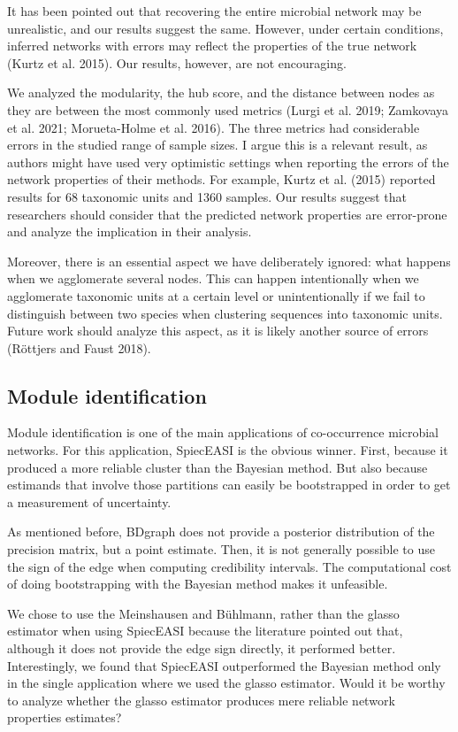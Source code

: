 \documentclass[
  a4paper,
]{article}
\begin{document}
It has been pointed out that recovering the entire microbial network may
be unrealistic, and our results suggest the same. However, under certain
conditions, inferred networks with errors may reflect the properties of
the true network (Kurtz et al. 2015). Our results, however, are not
encouraging.

We analyzed the modularity, the hub score, and the distance between
nodes as they are between the most commonly used metrics (Lurgi et al.
2019; Zamkovaya et al. 2021; Morueta-Holme et al. 2016). The three
metrics had considerable errors in the studied range of sample sizes. I
argue this is a relevant result, as authors might have used very
optimistic settings when reporting the errors of the network properties
of their methods. For example, Kurtz et al. (2015) reported results for
68 taxonomic units and 1360 samples. Our results suggest that
researchers should consider that the predicted network properties are
error-prone and analyze the implication in their analysis.

Moreover, there is an essential aspect we have deliberately ignored:
what happens when we agglomerate several nodes. This can happen
intentionally when we agglomerate taxonomic units at a certain level or
unintentionally if we fail to distinguish between two species when
clustering sequences into taxonomic units. Future work should analyze
this aspect, as it is likely another source of errors (Röttjers and
Faust 2018).

\hypertarget{module-identification-2}{%
\subsection{Module identification}\label{module-identification-2}}

Module identification is one of the main applications of co-occurrence
microbial networks. For this application, SpiecEASI is the obvious
winner. First, because it produced a more reliable cluster than the
Bayesian method. But also because estimands that involve those
partitions can easily be bootstrapped in order to get a measurement of
uncertainty.

As mentioned before, BDgraph does not provide a posterior distribution
of the precision matrix, but a point estimate. Then, it is not generally
possible to use the sign of the edge when computing credibility
intervals. The computational cost of doing bootstrapping with the
Bayesian method makes it unfeasible.

We chose to use the Meinshausen and Bühlmann, rather than the glasso
estimator when using SpiecEASI because the literature pointed out that,
although it does not provide the edge sign directly, it performed
better. Interestingly, we found that SpiecEASI outperformed the Bayesian
method only in the single application where we used the glasso
estimator. Would it be worthy to analyze whether the glasso estimator
produces mere reliable network properties estimates?
\end{document}
